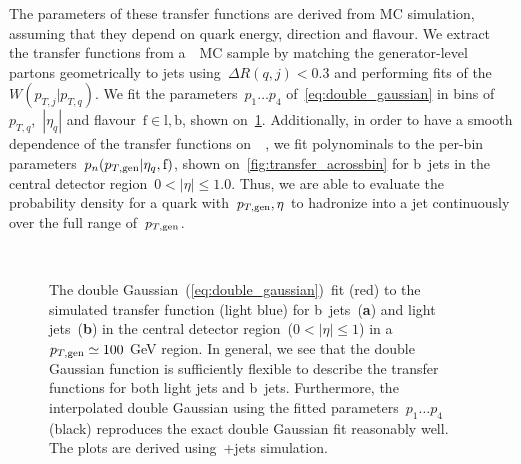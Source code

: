 The parameters of these transfer functions are derived from MC simulation, assuming that they depend on quark energy, direction and flavour. We extract the transfer functions from a~\ttbar~MC sample by matching the generator-level partons geometrically to jets using~$\Delta R(q,j) < 0.3$ and performing fits of the~$W(p_{T,j}|p_{T,q})$. We fit the parameters~$p_1 \dots p_4$ of~\cref{eq:double_gaussian} in bins of~$p_{T,q}$,~$|\eta_{q}|$ and flavour~$\mathrm{f}\in{\mathrm{l}, \mathrm{b}}$, shown on~\cref{fig:transfer_perbin}. Additionally, in order to have a smooth dependence of the transfer functions on~\ptgen~, we fit polynominals to the per-bin parameters~$p_n(p_{T,\mathrm{gen}}|\eta_{q},\mathrm{f})$, shown on~\cref{fig:transfer_acrossbin} for b~jets in the central detector region~$0 < |\eta| \le 1.0$. Thus, we are able to evaluate the probability density for a quark with~$p_{T,\mathrm{gen}},\eta$ to hadronize into a jet continuously over the full range of~$p_{T,\mathrm{gen}}$.

\begin{figure}
\begin{centering}
 \\
\caption[The double-Gaussian transfer function fit in~\ttbar~simulation.]{The double Gaussian~(\cref{eq:double_gaussian})~fit (red) to the simulated transfer function (light blue) for b~jets~(\textbf{a}) and light jets~(\textbf{b}) in the central detector region~($0 < |\eta| \le 1$) in a~$p_{T,\mathrm{gen}} \simeq 100$ GeV region. In general, we see that the double Gaussian function is sufficiently flexible to describe the transfer functions for both light jets and b~jets. Furthermore, the interpolated double Gaussian using the fitted parameters~$p_1 \dots p_4$ (black) reproduces the exact double Gaussian fit reasonably well. The plots are derived using~\ttbar+jets simulation.}
\label{fig:transfer_perbin}
\end{centering}
\end{figure}

